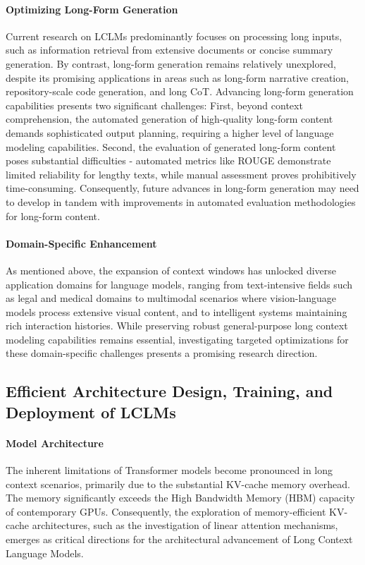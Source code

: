 \documentclass[11pt, a4paper, logo, copyright, nonumbering]{map}
\begin{document}
\paragraph{Optimizing Long-Form Generation} Current research on LCLMs predominantly focuses on processing long inputs, such as information retrieval from extensive documents or concise summary generation. By contrast, long-form generation remains relatively unexplored, despite its promising applications in areas such as long-form narrative creation, repository-scale code generation, and long CoT. Advancing long-form generation capabilities presents two significant challenges: First, beyond context comprehension, the automated generation of high-quality long-form content demands sophisticated output planning, requiring a higher level of language modeling capabilities. Second, the evaluation of generated long-form content poses substantial difficulties - automated metrics like ROUGE demonstrate limited reliability for lengthy texts, while manual assessment proves prohibitively time-consuming. Consequently, future advances in long-form generation may need to develop in tandem with improvements in automated evaluation methodologies for long-form content.
\paragraph{Domain-Specific Enhancement} As mentioned above, the expansion of context windows has unlocked diverse application domains for language models, ranging from text-intensive fields such as legal and medical domains to multimodal scenarios where vision-language models process extensive visual content, and to intelligent systems maintaining rich interaction histories. While preserving robust general-purpose long context modeling capabilities remains essential, investigating targeted optimizations for these domain-specific challenges presents a promising research direction.

\subsection{Efficient Architecture Design, Training, and Deployment of LCLMs}







\paragraph{Model Architecture} The inherent limitations of Transformer models become pronounced in long context scenarios, primarily due to the substantial KV-cache memory overhead. The memory significantly exceeds the High Bandwidth Memory (HBM) capacity of contemporary GPUs. Consequently, the exploration of memory-efficient KV-cache architectures, such as the investigation of linear attention mechanisms, emerges as  critical directions for the architectural advancement of Long Context Language Models.
\end{document}

